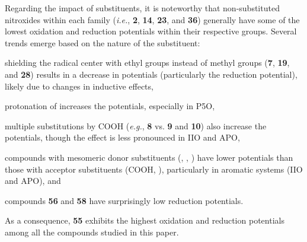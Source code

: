 \documentclass[review]{elsarticle}
\begin{document}
Regarding the impact of substituents, it is noteworthy that non-substituted nitroxides within each family (\textit{i.e.}, \textbf{2}, \textbf{14}, \textbf{23}, and \textbf{36}) generally have some of the lowest oxidation and reduction potentials within their respective groups. Several trends emerge based on the nature of the substituent: \begin{inparaenum}[(i)]
	\item shielding the radical center with ethyl groups instead of methyl groups (\textbf{7}, \textbf{19}, and \textbf{28}) results in a decrease in potentials (particularly the reduction potential), likely due to changes in inductive effects,
	\item protonation of  increases the potentials, especially in P5O,
	\item multiple substitutions by COOH (\textit{e.g.}, \textbf{8} vs. \textbf{9} and \textbf{10}) also increase the potentials, though the effect is less pronounced in IIO and APO,
	\item compounds with mesomeric donor substituents (, , ) have lower potentials than those with acceptor substituents (COOH, ), particularly in aromatic systems (IIO and APO), and
	\item compounds \textbf{56} and \textbf{58} have surprisingly low reduction potentials.
\end{inparaenum}
As a consequence, \textbf{55} exhibits the highest oxidation and reduction potentials among all the compounds studied in this paper.
\end{document}

